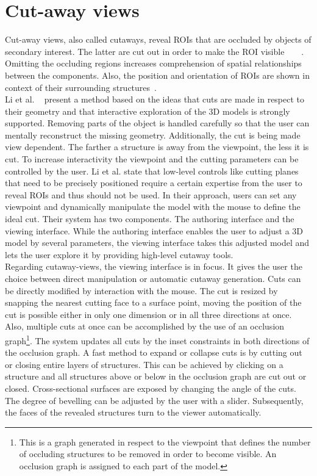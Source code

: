 \section{Cut-away views}
Cut-away views, also called cutaways, reveal ROIs that are occluded by objects of secondary interest. The latter are cut out in order to make the ROI visible~\cite{proc:volumeshop}~\cite{jour:adaptiveCutaways}~\cite{jour:correa}~\cite{incoll:cutawayIllustration}. Omitting the occluding regions increases comprehension of spatial relationships between the components. Also, the position and orientation of ROIs are shown in context of their surrounding structures~\cite{jour:interactiveCutaway}.\\
\newline
Li et al. ~\cite{jour:interactiveCutaway} present a method based on the ideas that cuts are made in respect to their geometry and that interactive exploration of the 3D models is strongly supported. Removing parts of the object is handled carefully so that the user can mentally reconstruct the missing geometry. Additionally, the cut is being made view dependent. The farther a structure is away from the viewpoint, the less it is cut. To increase interactivity the viewpoint and the cutting parameters can be controlled by the user. Li et al. state that low-level controls like cutting planes that need to be precisely positioned require a certain expertise from the user to reveal ROIs and thus should not be used. In their approach, users can set any viewpoint and dynamically manipulate the model with the mouse to define the ideal cut. Their system has two components. The authoring interface and the viewing interface. While the authoring interface enables the user to adjust a 3D model by several parameters, the viewing interface takes this adjusted model and lets the user explore it by providing high-level cutaway tools.\\
Regarding cutaway-views, the viewing interface is in focus. It gives the user the choice between direct manipulation or automatic cutaway generation. Cuts can be directly modified by interaction with the mouse. The cut is resized by snapping the nearest cutting face to a surface point, moving the position of the cut is possible either in only one dimension or in all three directions at once. Also, multiple cuts at once can be accomplished by the use of an occlusion graph\footnote{This is a graph generated in respect to the viewpoint that defines the number of occluding structures to be removed in order to become visible. An occlusion graph is assigned to each part of the model.}. The system updates all cuts by the inset constraints in both directions of the occlusion graph. A fast method to expand or collapse cuts is by cutting out or closing entire layers of structures. This can be achieved by clicking on a structure and all structures above or below in the occlusion graph are cut out or closed. Cross-sectional surfaces are exposed by changing the angle of the cuts. The degree of bevelling can be adjusted by the user with a slider. Subsequently, the faces of the revealed structures turn to the viewer automatically.\\
